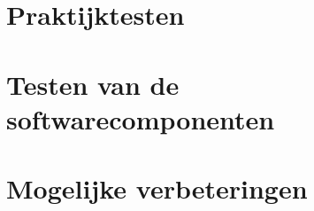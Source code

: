 





\section{Praktijktesten}


\section{Testen van de softwarecomponenten}

\section{Mogelijke verbeteringen}

